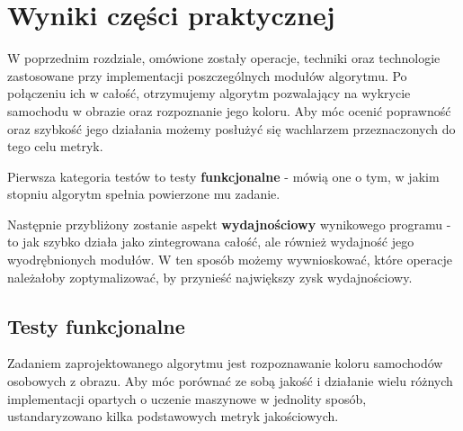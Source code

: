 \section{Wyniki części praktycznej}
W poprzednim rozdziale, omówione zostały operacje, techniki oraz technologie zastosowane przy implementacji poszczególnych modułów algorytmu. Po połączeniu ich w całość, otrzymujemy algorytm pozwalający na wykrycie samochodu w obrazie oraz rozpoznanie jego koloru. Aby móc ocenić poprawność oraz szybkość jego działania możemy posłużyć się wachlarzem przeznaczonych do tego celu metryk. 

Pierwsza kategoria testów to testy \textbf{funkcjonalne} - mówią one o tym, w jakim stopniu algorytm spełnia powierzone mu zadanie. 

Następnie przybliżony zostanie aspekt \textbf{wydajnościowy} wynikowego programu - to jak szybko działa jako zintegrowana całość, ale również wydajność jego wyodrębnionych modułów. W ten sposób możemy wywnioskować, które operacje należałoby zoptymalizować, by przynieść największy zysk wydajnościowy.

\subsection{Testy funkcjonalne}
Zadaniem zaprojektowanego algorytmu jest rozpoznawanie koloru samochodów osobowych z obrazu. Aby móc porównać ze sobą jakość i działanie wielu różnych implementacji opartych o uczenie maszynowe w jednolity sposób, ustandaryzowano kilka podstawowych metryk jakościowych. 

